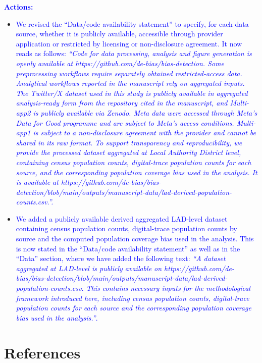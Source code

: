 \documentclass[
  letterpaper,
  DIV=11,
  numbers=noendperiod]{scrartcl}
\begin{document}
\begin{itemize}[noitemsep, topsep=0pt]
{\setlength{\leftskip}{0.5cm}\textcolor{blue}{\textbf{Actions:}}
\vspace{-3mm} \begin{itemize}[noitemsep, topsep=0pt]
\item \textcolor{blue}{We revised the ``Data/code availability statement'' to specify, for each data source, whether it is publicly available, accessible through provider application or restricted by licensing or non-disclosure agreement. It now reads as follows: \textit{``Code for data processing, analysis and figure generation is openly available at https://github.com/de-bias/bias-detection. Some preprocessing workflows require separately obtained restricted-access data. Analytical workflows reported in the manuscript rely on aggregated inputs. The Twitter/X dataset used in this study is publicly available in aggregated analysis-ready form from the repository cited in the manuscript, and Multi-app2 is publicly available via Zenodo. Meta data were accessed through Meta’s Data for Good programme and are subject to Meta's access conditions. Multi-app1 is subject to a non-disclosure agreement with the provider and cannot be shared in its raw format. To support transparency and reproducibility, we provide the processed dataset aggregated at Local Authority District level, containing census population counts, digital-trace population counts for each source, and the corresponding population coverage bias used in the analysis. It is available at https://github.com/de-bias/bias-detection/blob/main/outputs/manuscript-data/lad-derived-population-counts.csv.''.}}
\item \textcolor{blue}{We added a publicly available derived aggregated LAD-level dataset containing census population counts, digital-trace population counts by source and the computed population coverage bias used in the analysis. This is now stated in the ``Data/code availability statement'' as well as in the ``Data'' section, where we have added the following text: \textit{``A dataset aggregated at LAD-level is publicly available on https://github.com/de-bias/bias-detection/blob/main/outputs/manuscript-data/lad-derived-population-counts.csv. This contains necessary inputs for the methodological framework introduced here, including census population counts, digital-trace population counts for each source and the corresponding population coverage bias used in the analysis.''}. }
\end{itemize}

\section{References}

}
\end{itemize}
\end{document}
